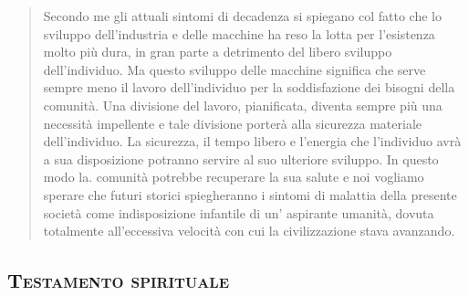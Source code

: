 \documentclass[a4paper, oneside]{article}
\newcounter{i}%
\newcounter{n}%
\newcounter{I}%
\newcommand{\titolo}[1]{\textsc{#1}} %
\begin{document}
\begin{quotation}
Secondo me gli attuali sintomi di decadenza si spiegano col fatto che lo sviluppo dell'industria e delle macchine ha reso la lotta per l'esistenza molto più dura, in gran parte a detrimento del libero sviluppo dell'individuo. Ma questo sviluppo delle macchine significa che serve sempre meno il lavoro dell'individuo per la soddisfazione dei bisogni della comunità. Una divisione del lavoro, pianificata, diventa sempre più una necessità impellente e tale divisione porterà alla sicurezza materiale dell'individuo. La sicurezza, il tempo libero e l'energia che l'individuo avrà a sua disposizione potranno servire al suo ulteriore sviluppo. In questo modo la. comunità potrebbe recuperare la sua salute e noi vogliamo sperare che futuri storici spiegheranno i sintomi di malattia della presente società come indisposizione infantile di un' aspirante umanità, dovuta totalmente all'eccessiva velocità con cui la civilizzazione stava avanzando.
\end{quotation}

\subsection*{\titolo{Testamento spirituale}}
\end{document}
